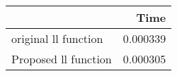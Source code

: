 \begin{tabular}{lr}
\toprule
{} &      Time \\
\midrule
original ll function &  0.000339 \\
Proposed ll function &  0.000305 \\
\bottomrule
\end{tabular}
